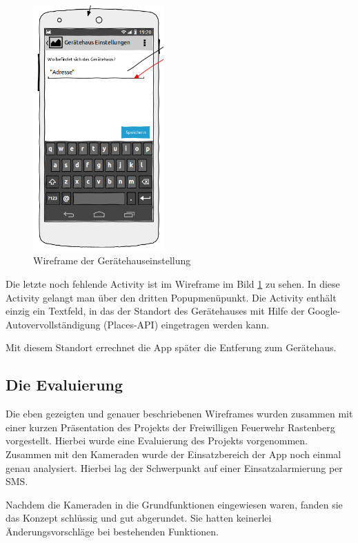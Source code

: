 \begin{figure}
\vspace{-13pt}
\includegraphics[width=5cm]{Bilder/WireframeGeraetehaus.png}
\caption{Wireframe der Ger\"atehauseinstellung}
\label{Wireframe Geraetehaus}
\vspace{-250pt}
\end{figure}
Die letzte noch fehlende Activity ist im Wireframe im Bild \ref{Wireframe Geraetehaus} zu sehen. In diese Activity gelangt man \"uber den dritten Popupmen\"upunkt. Die Activity enth\"alt einzig ein Textfeld, in das der Standort des Ger\"atehauses mit Hilfe der Google-Autovervollst\"andigung (Places-\ac{API}) eingetragen werden kann.

Mit diesem Standort errechnet die App sp\"ater die Entferung zum Ger\"atehaus.
\newpage

\subsection{Die Evaluierung}
Die eben gezeigten und genauer beschriebenen Wireframes wurden zusammen mit einer kurzen Pr\"asentation des Projekts der Freiwilligen Feuerwehr Rastenberg vorgestellt.
Hierbei wurde eine Evaluierung des Projekts vorgenommen. Zusammen mit den Kameraden wurde der Einsatzbereich der App noch einmal genau analysiert. Hierbei lag der Schwerpunkt auf einer Einsatzalarmierung per SMS. 

Nachdem die Kameraden in die Grundfunktionen eingewiesen waren, fanden sie das Konzept schl\"ussig und gut abgerundet. Sie hatten keinerlei \"Anderungsvorschl\"age bei bestehenden Funktionen. 


